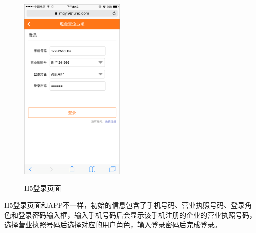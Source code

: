 \begin{figure}
	\includegraphics[width=0.45\textwidth]{picture/h5_login.pdf}
	\label{fig:h5_login}
	\caption{H5登录页面}
\end{figure}

H5登录页面和APP不一样，初始的信息包含了手机号码、营业执照号码、登录角色和登录密码输入框，输入手机号码后会显示该手机注册的企业的营业执照号码，选择营业执照号码后选择对应的用户角色，输入登录密码后完成登录。\par

